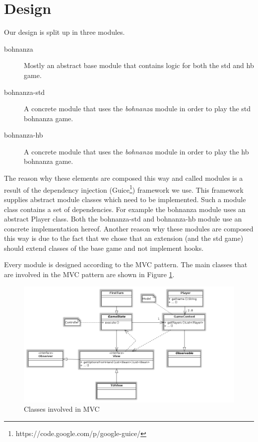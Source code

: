 \section{Design}

Our design is split up in three modules.
\begin{description}
    \item[bohnanza] {Mostly an abstract base module that contains logic for both the \gls{std} and
    \gls{hb} game.}
    \item[bohnanza-std] {A concrete module that uses the \emph{bohnanza} module in order to play
    the \gls{std} bohnanza game.}
    \item[bohnanza-hb] {A concrete module that uses the \emph{bohnanza} module in order to play the
    \gls{hb} bohnanza game.}
\end{description}
The reason why these elements are composed this way and called modules is a result of the dependency
injection (Guice\footnote{https://code.google.com/p/google-guice/}) framework we use. This framework supplies abstract module classes which
need to be implemented. Such a module class contains a set of dependencies. For example the bohnanza module uses an abstract Player class.
Both the bohnanza-std and bohnanza-hb module use an concrete implementation hereof. Another reason why these modules are composed this way
is due to the fact that we chose that an extension (and the \gls{std} game) should extend classes of the base game and not implement hooks. 

Every module is designed according to the MVC pattern. The main classes that are involved in the MVC pattern are shown in Figure
\ref{fig:design:mvc}.

 \begin{figure}[h!]
    \includegraphics[width=\textwidth]{../img/Mvc}
    \caption{Classes involved in MVC}
    \label{fig:design:mvc}
\end{figure}


